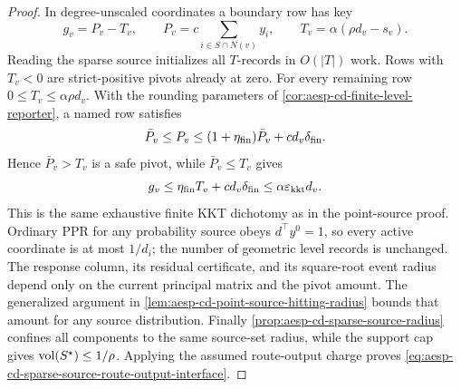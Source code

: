 \begin{proof}
In degree-unscaled coordinates a boundary row has key
\begin{equation*}
 g_v=P_v-T_v,
 \qquad
 P_v=c\sum_{i\in S\cap N(v)}y_i,
 \qquad
 T_v=\alpha(\rho d_v-s_v).
\end{equation*}
Reading the sparse source initializes all $T$-records in $O(|T|)$ work.
Rows with $T_v<0$ are strict-positive pivots already at zero.  For every
remaining row $0\leq T_v\leq\alpha\rho d_v$.  With the rounding parameters
of \cref{cor:aesp-cd-finite-level-reporter}, a named row satisfies
\begin{equation*}
 \bar P_v\leq P_v
 \leq(1+\eta_{\rm fin})\bar P_v+c d_v\delta_{\rm fin}.
\end{equation*}
Hence $\bar P_v>T_v$ is a safe pivot, while $\bar P_v\leq T_v$ gives
\begin{equation*}
 g_v
 \leq\eta_{\rm fin}T_v+c d_v\delta_{\rm fin}
 \leq\alpha\varepsilon_{\mathrm{kkt}} d_v.
\end{equation*}
This is the same exhaustive finite KKT dichotomy as in the point-source
proof.  Ordinary PPR for any probability source obeys $d^\top y^0=1$, so
every active coordinate is at most $1/d_i$; the number of geometric level
records is unchanged.  The response column, its residual certificate, and
its square-root event radius depend only on the current principal matrix and
the pivot amount.  The generalized argument in
\cref{lem:aesp-cd-point-source-hitting-radius} bounds that amount for any
source distribution.  Finally
\cref{prop:aesp-cd-sparse-source-radius} confines all components to the same
source-set radius, while the support cap gives
\(\operatorname{vol}(S^\star)\leq1/\rho\).  Applying the assumed route-output charge proves
\cref{eq:aesp-cd-sparse-source-route-output-interface}.
\end{proof}

